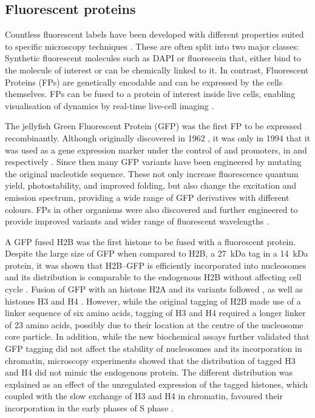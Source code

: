   \subsection{Fluorescent proteins}
    Countless fluorescent labels have been developed with different
    properties suited to specific microscopy techniques
    \citep{rizzo2009fluorescent, FP-color-palette}.
    These are often split into two major classes:
    Synthetic fluorescent
    molecules such as DAPI or fluorescein that, either bind to the molecule of
    interest or can be chemically linked to it.
    In contrast, Fluorescent Proteins (FPs)
    are genetically encodable and can be expressed by the cells themselves.
    FPs can be fused to a protein of interest inside live cells, enabling
    visualisation of dynamics by real-time live-cell imaging
    \citep{rizzo2009fluorescent}.

    The  jellyfish
    Green Fluorescent Protein (GFP) was
    the first FP to be expressed recombinantly.
    Although originally discovered in 1962 \citep{shimomura1962-gfp-discovery},
    it was only in 1994 that it was used as a gene expression
    marker under the control of  and
     promoters, in 
    and 
    respectively \citep{gfp-first-expression-marker}.
    Since then many GFP variants have been engineered by mutating the
    original nucleotide sequence.  These not only increase fluorescence
    quantum yield, photostability, and improved folding, but also change
    the excitation and emission spectrum, providing a wide range of GFP
    derivatives with different colours.
    FPs in other organisms were also
    discovered and further engineered to provide improved
    variants and wider range of fluorescent wavelengths
    \citep{FP-color-palette}.

    A GFP fused H2B was the first histone to be fused with a
    fluorescent protein.  Despite the large size of GFP when compared
    to H2B, a \SI{27}{\kilo\dalton} tag in a \SI{14}{\kilo\dalton}
    protein, it was shown that H2B--GFP is efficiently incorporated
    into nucleosomes and its distribution is comparable to the
    endogenous H2B without affecting cell cycle \citep{KevinH2BGFP}.
    Fusion of GFP with an histone H2A and its variants followed
    \citep{perche2000higher}, as well as histones H3 and H4
    \citep{KimuraCook}.  However, while the original tagging of H2B
    made use of a linker sequence of six amino acids, tagging of H3
    and H4 required a longer linker of 23 amino acids, possibly due to
    their location at the centre of the nucleosome core particle.  In
    addition, while the new biochemical assays further validated that
    GFP tagging did not affect the stability of nucleosomes and its
    incorporation in chromatin, microscopy experiments showed that the
    distribution of tagged H3 and H4 did not mimic the endogenous
    protein.  The different distribution was explained as an effect of
    the unregulated expression of the tagged histones, which coupled
    with the slow exchange of H3 and H4 in chromatin, favoured their
    incorporation in the early phases of S phase \citep{KimuraCook}.

